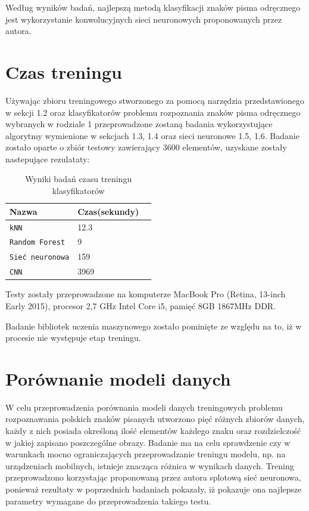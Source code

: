 \documentclass[brudnopis]{xmgr}
\begin{document}
Według wyników badań, najlepszą metodą klasyfikacji znaków pisma odręcznego jest wykorzystanie konwolucyjnych sieci neuronowych proponowanych przez autora.

\section{Czas treningu}

Używając zbioru treningowego stworzonego za pomocą narzędzia przedstawionego w sekcji 1.2 oraz klasyfikatorów problemu rozpoznania znaków pisma odręcznego wybranych w rodziale 1 przeprowadzone zostaną badania wykorzystujące algorytmy wymienione w sekcjach 1.3, 1.4 oraz sieci neuronowe 1.5, 1.6. Badanie zostało oparte o zbiór testowy zawierający 3600 elementów, uzyskane zostały nastepujące rezulataty: 

\begin{table}[!htb]
\begin{tabular}{|l|l|l|} \hline
Nazwa & Czas(sekundy) \\ \hline
\texttt{kNN} & 12.3 \\ \hline
\texttt{Random Forest} & 9 \\ \hline
\texttt{Sieć neuronowa} & 159 \\ \hline
\texttt{CNN}     & 3969 \\ \hline
\end{tabular}
\caption{Wyniki badań czasu treningu klasyfikatorów}
\end{table}

Testy zostały przeprowadzone na komputerze MacBook Pro
(Retina, 13-inch Early 2015), procesor 2,7 GHz Intel Core i5, pamięć 8GB 1867MHz DDR.

Badanie bibliotek uczenia maszynowego zostało pominięte ze względu na to, iż w procesie nie występuje etap treningu.

\section{Porównanie modeli danych}

W celu przeprowadzenia porównania modeli danych treningowych problemu rozpoznawania polskich znaków pisanych utworzono pięć różnych zbiorów danych, każdy z nich posiada określoną ilość elementów każdego znaku oraz rozdzielczość w jakiej zapisano poszczególne obrazy. Badanie ma na celu sprawdzenie czy w warunkach mocno ograniczających przeprowadzanie treningu modelu, np. na urządzeniach mobilnych, istnieje znacząca różnica w wynikach danych. Trening przeprowadzono korzystając proponowaną przez autora splotową sieć neuronowa, ponieważ rezultaty w poprzednich badaniach pokazały, iż pokazuje ona najlepsze parametry wymagane do przeprowadzenia takiego testu.
\end{document}
